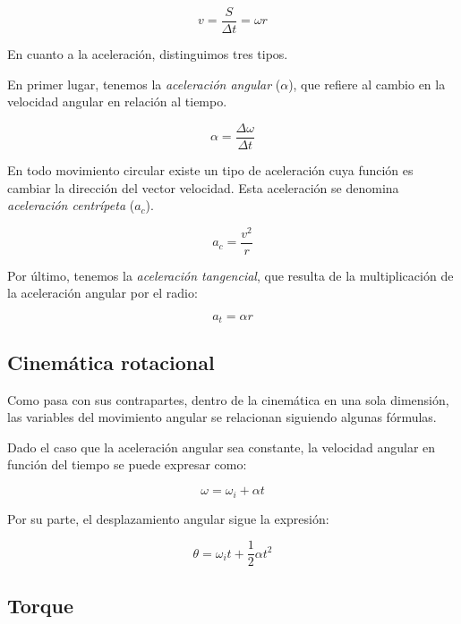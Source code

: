 \documentclass[12pt]{article}
\begin{document}
\begin{equation}
	v = \frac{S}{\Delta t} = \omega r
\end{equation}

En cuanto a la aceleración, distinguimos tres tipos.

En primer lugar,
tenemos la \textit{aceleración angular} (\(\alpha\)),
que refiere al cambio en la velocidad angular en relación al tiempo.

\begin{equation}
	\alpha = \frac{\Delta\omega}{\Delta t}
\end{equation}

En todo movimiento circular existe un tipo de aceleración cuya función es cambiar la dirección del vector velocidad.
Esta aceleración se denomina \textit{aceleración centrípeta} (\(a_{c}\)).

\begin{equation}
	a_{c} = \frac{v^{2}}{r}
\end{equation}

Por último,
tenemos la \textit{aceleración tangencial},
que resulta de la multiplicación de la aceleración angular por el radio:

\begin{equation}
	a_{t} = \alpha r
\end{equation}

\subsection{Cinemática rotacional}

Como pasa con sus contrapartes,
dentro de la cinemática en una sola dimensión,
las variables del movimiento angular se relacionan siguiendo algunas fórmulas.

Dado el caso que la aceleración angular sea constante, 
la velocidad angular en función del tiempo se puede expresar como:

\begin{equation}
	\omega = \omega_{i} + \alpha t
\end{equation}

Por su parte,
el desplazamiento angular sigue la expresión:

\begin{equation}
	\theta = \omega_{i}t + \frac{1}{2}\alpha t^{2}
\end{equation}

\subsection{Torque}
\end{document}
